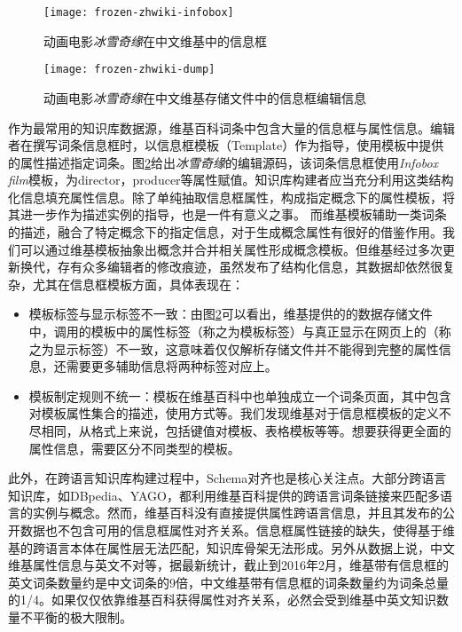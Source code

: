 \begin{figure}[h]
  \centering
  \texttt{[image: frozen-zhwiki-infobox]}
  \caption{动画电影\textit{冰雪奇缘}在中文维基中的信息框}
  \label{fig:frozen-zhwiki-infobox}
\end{figure}

\begin{figure}[h]
  \centering
  \texttt{[image: frozen-zhwiki-dump]}
  \caption{动画电影\textit{冰雪奇缘}在中文维基存储文件中的信息框编辑信息}
  \label{fig:frozen-zhwiki-dump}
\end{figure}

作为最常用的知识库数据源，维基百科词条中包含大量的信息框与属性信息。编辑者在撰写词条信息框时，以信息框模板（Template）作为指导，使用模板中提供的属性描述指定词条。图\ref{fig:frozen-zhwiki-dump}给出\textit{冰雪奇缘}的编辑源码，该词条信息框使用\textit{Infobox film}模板，为director，producer等属性赋值。知识库构建者应当充分利用这类结构化信息填充属性信息。除了单纯抽取信息框属性，构成指定概念下的属性模板，将其进一步作为描述实例的指导，也是一件有意义之事。
而维基模板辅助一类词条的描述，融合了特定概念下的指定信息，对于生成概念属性有很好的借鉴作用。我们可以通过维基模板抽象出概念并合并相关属性形成概念模板。但维基经过多次更新换代，存有众多编辑者的修改痕迹，虽然发布了结构化信息，其数据却依然很复杂，尤其在信息框模板方面，具体表现在：
\begin{itemize}
\item {\heiti 模板标签与显示标签不一致}：由图\ref{fig:frozen-zhwiki-dump}可以看出，维基提供的的数据存储文件中，调用的模板中的属性标签（称之为模板标签）与真正显示在网页上的（称之为显示标签）不一致，这意味着仅仅解析存储文件并不能得到完整的属性信息，还需要更多辅助信息将两种标签对应上。
\item {\heiti 模板制定规则不统一}：模板在维基百科中也单独成立一个词条页面，其中包含对模板属性集合的描述，使用方式等。我们发现维基对于信息框模板的定义不尽相同，从格式上来说，包括键值对模板、表格模板等等。想要获得更全面的属性信息，需要区分不同类型的模板。
\end{itemize}

此外，在跨语言知识库构建过程中，Schema对齐也是核心关注点。大部分跨语言知识库，如DBpedia、YAGO，都利用维基百科提供的跨语言词条链接来匹配多语言的实例与概念。然而，维基百科没有直接提供属性跨语言信息，并且其发布的公开数据也不包含可用的信息框属性对齐关系。信息框属性链接的缺失，使得基于维基的跨语言本体在属性层无法匹配，知识库骨架无法形成。另外从数据上说，中文维基属性信息与英文不对等，据最新统计，截止到2016年2月，维基带有信息框的英文词条数量约是中文词条的9倍，中文维基带有信息框的词条数量约为词条总量的1/4。如果仅仅依靠维基百科获得属性对齐关系，必然会受到维基中英文知识数量不平衡的极大限制。

